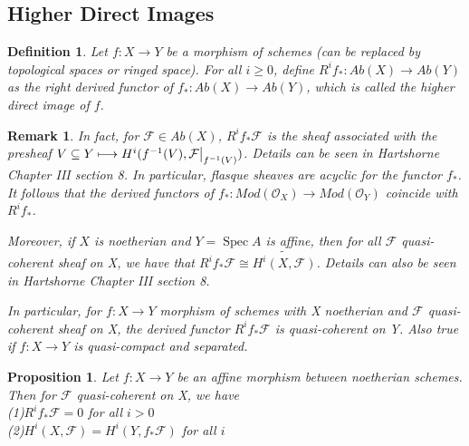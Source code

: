 \documentclass{ctexart}
\newtheorem{definition}{Definition}[section]
\newtheorem{remark}{Remark}[section]
\newtheorem{proposition}{Proposition}[section]
\newcommand{\spec}{\operatorname{Spec}}
\begin{document}
\subsection{Higher Direct Images}
\begin{definition}
    Let $f: X \longrightarrow Y$ be a morphism of schemes (can be replaced by topological spaces or ringed space).
    For all $i \ge 0$, define $R^{i}f_{\ast}: Ab(X) \longrightarrow Ab(Y)$ as the right derived functor of $f_{\ast}: Ab(X) \longrightarrow Ab(Y)$,
    which is called the higher direct image of $f$.
\end{definition}
\begin{remark}
    In fact, for $\mathcal{F} \in Ab(X)$, $R^{i}f_{\ast}\mathcal{F}$ is the sheaf associated with the presheaf $V \subseteq Y \longmapsto H^{i}(f^{-1}(V), \mathcal{F}\big{|}_{f^{-1}(V)})$.
    Details can be seen in Hartshorne Chapter III section 8. 
    In particular, flasque sheaves are acyclic for the functor $f_{\ast}$.
    It follows that the derived functors of $f_{\ast}: Mod(\mathcal{O}_{X}) \longrightarrow Mod(\mathcal{O}_{Y})$ coincide with $R^{i}f_{\ast}$.
    \par
    Moreover, if $X$ is noetherian and $Y = \spec A$ is affine,
    then for all $\mathcal{F}$ quasi-coherent sheaf on X, we have that $R^{i}f_{\ast}\mathcal{F} \cong \widetilde{H^{i}(X, \mathcal{F})}$.
    Details can also be seen in Hartshorne Chapter III section 8. 
    \par
    In particular, for $f: X \longrightarrow Y$ morphism of schemes with X noetherian and $\mathcal{F}$ quasi-coherent sheaf on X,
    the derived functor $R^{i}f_{\ast}\mathcal{F}$ is quasi-coherent on Y.
    Also true if $f: X \longrightarrow Y$ is quasi-compact and separated.
\end{remark}
\begin{proposition}
    Let $f: X \longrightarrow Y$ be an affine morphism between noetherian schemes.
    Then for $\mathcal{F}$ quasi-coherent on X, we have \\
    (1)$R^{i}f_{\ast}\mathcal{F} = 0$ for all $i > 0$ \\
    (2)$H^{i}(X, \mathcal{F}) = H^{i}(Y, f_{\ast}\mathcal{F})$ for all $i$ \\
    \label{Proposition 7.9}
\end{proposition}
\end{document}
